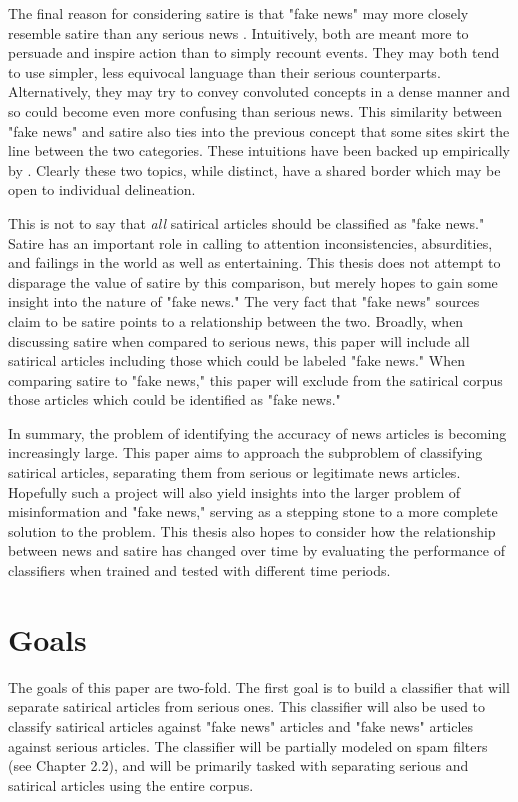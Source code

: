\documentclass [12 pt] {report}
\begin{document}
The final reason for considering satire is that "fake news" may more closely resemble satire than any serious news \cite{Horne}. Intuitively, both are meant more to persuade and inspire action than to simply recount events. They may both tend to use simpler, less equivocal language than their serious counterparts. Alternatively, they may try to convey convoluted concepts in a dense manner and so could become even more confusing than serious news. This similarity between "fake news" and satire also ties into the previous concept that some sites skirt the line between the two categories. These intuitions have been backed up empirically by \cite{Horne}. Clearly these two topics, while distinct, have a shared border which may be open to individual delineation.

This is not to say that \textit{all} satirical articles should be classified as "fake news." Satire has an important role in calling to attention inconsistencies, absurdities, and failings in the world as well as entertaining. This thesis does not attempt to disparage the value of satire by this comparison, but merely hopes to gain some insight into the nature of "fake news." The very fact that "fake news" sources claim to be satire points to a relationship between the two. Broadly, when discussing satire when compared to serious news, this paper will include all satirical articles including those which could be labeled "fake news." When comparing satire to "fake news," this paper will exclude from the satirical corpus those articles which could be identified as "fake news."

In summary, the problem of identifying the accuracy of news articles is becoming increasingly large. This paper aims to approach the subproblem of classifying satirical articles, separating them from serious or legitimate news articles. Hopefully such a project will also yield insights into the larger problem of misinformation and "fake news," serving as a stepping stone to a more complete solution to the problem. This thesis also hopes to consider how the relationship between news and satire has changed over time by evaluating the performance of classifiers when trained and tested with different time periods.

\section{Goals}
The goals of this paper are two-fold. The first goal is to build a classifier that will separate satirical articles from serious ones. This classifier will also be used to classify satirical articles against "fake news" articles and "fake news" articles against serious articles. The classifier will be partially modeled on spam filters (see Chapter 2.2), and will be primarily tasked with separating serious and satirical articles using the entire corpus.
\end{document}
